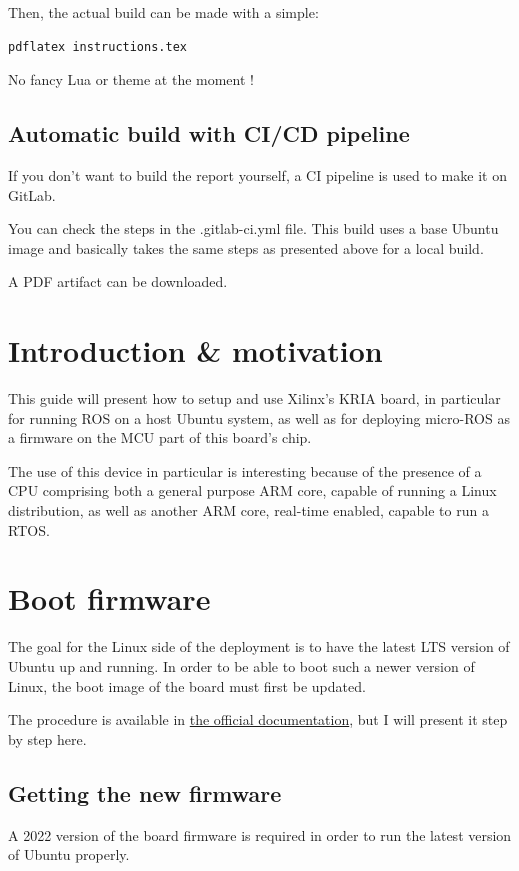 \documentclass[10pt]{article}
\begin{document}
Then, the actual build can be made with a simple:

\begin{verbatim}
pdflatex instructions.tex
\end{verbatim}

No fancy Lua or theme at the moment !

\subsection{Automatic build with CI/CD pipeline}
\label{sec:org96d47cb}
If you don't want to build the report yourself, a CI pipeline is used to make it on GitLab.

You can check the steps in the .gitlab-ci.yml file.
This build uses a base Ubuntu image and basically takes the same steps as presented above for a local build.

A PDF artifact can be downloaded.

\section{Introduction \& motivation}
\label{sec:orge49a531}
This guide will present how to setup and use Xilinx's KRIA board, in particular
for running ROS on a host Ubuntu system, as well as for deploying
micro-ROS as a firmware on the MCU part of this board's chip.

The use of this device in particular is interesting because of the presence
of a CPU comprising both a general purpose ARM core, capable of running
a Linux distribution, as well as another ARM core, real-time enabled,
capable to run a RTOS.

\section{Boot firmware}
\label{sec:org60db204}
The goal for the Linux side of the deployment is to
have the latest LTS version of Ubuntu up and running.
In order to be able to boot such a newer version of Linux, the
boot image of the board must first be updated.

The procedure is available in \href{https://docs.xilinx.com/r/en-US/ug1089-kv260-starter-kit/Firmware-Update}{the official documentation},
but I will present it step by step here.

\subsection{Getting the new firmware}
\label{sec:org9bf8cb2}
A 2022 version of the board firmware is required in order to run the latest
version of Ubuntu properly.
\end{document}
